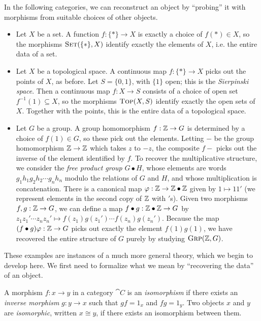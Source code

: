 \begin{ex} In the following categories, we can reconstruct an object by
    ``probing'' it with morphisms from suitable choices of other objects.
  \begin{itemize}
    \item Let $X$ be a set. A function $f: \{*\}\to X$ is exactly a choice of
      $f(*)\in X$, so the morphisms ${\textsc{\text{Set}}}(\{*\}, X)$ identify exactly the
      elements of $X$, i.e. the entire data of a set.
    \item Let $X$ be a topological space. A continuous map $f: \{*\}\to X$ picks
      out the points of $X$, as before. Let $S = \{0, 1\}$, with $\{1\}$ open;
      this is the \emph{Sierpinski space}. Then a continuous map $f: X\to S$
      consists of a choice of open set $f^{-1}(1)\subseteq X$, so the morphisms
      ${\textsc{\text{Top}}}(X, S)$ identify exactly the open sets of $X$. Together with
      the points, this is the entire data of a topological space.
    \item Let $G$ be a group. A group homomorphism $f: \mathbb{Z}\to G$ is determined by a
      choice of $f(1)\in G$, so these pick out the elements. Letting $-$ be
      the group homomorphism $\mathbb{Z}\to\mathbb{Z}$ which takes $z$ to $-z$, the composite
      $f-$ picks out the inverse of the element identified by $f$. To recover
      the multiplicative structure, we consider the \emph{free product group}
      $G\bullet H$, whose elements are words $g_1h_1g_2h_2\cdots g_nh_n$ modulo
      the relations of $G$ and $H$, and whose multiplication is concatenation.
      There is a canonical map $\varphi: \mathbb{Z}\to\mathbb{Z}\bullet\mathbb{Z}$ given by $1\mapsto
      11'$ (we represent elements in the second copy of $\mathbb{Z}$ with $'$s).
      Given two morphisms $f,g: \mathbb{Z}\to G$, we can define a map $f\bullet g:
      \mathbb{Z}\bullet\mathbb{Z}\to G$ by $z_1z_1'\cdots z_nz_n' \mapsto f(z_1)g(z_1')\cdots
      f(z_n)g(z_n')$. Because the map $(f\bullet g)\varphi: \mathbb{Z}\to G$ picks out
      exactly the element $f(1)g(1)$, we have recovered the entire structure of $G$
      purely by studying ${\textsc{\text{Grp}}}(\mathbb{Z}, G)$.
  \end{itemize}
\end{ex}

These examples are instances of a much more general theory, which we begin to
develop here. We first need to formalize what we mean by ``recovering the
data'' of an object.

\begin{dfn}[isomorphism]\label{def:isomorphism}
  A morphism $f: x\to y$ in a category $\cat{C}$ is an \emph{isomorphism} if
  there exists an \emph{inverse morphism} $g: y\to x$ such that $gf = 1_x$ and
  $fg = 1_y$. Two objects $x$ and $y$ are \emph{isomorphic}, written $x\cong y$,
  if there exists an isomorphism between them.
\end{dfn}

